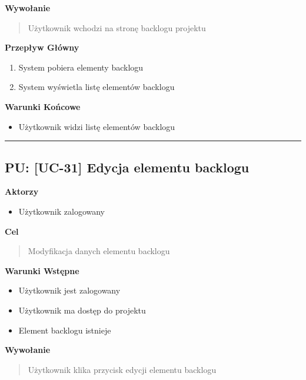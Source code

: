 \vspace{0.2cm}
\noindent\textbf{Wywołanie}
\begin{quote}
    Użytkownik wchodzi na stronę backlogu projektu
\end{quote}

\vspace{0.2cm}
\noindent\textbf{Przepływ Główny}
\begin{enumerate}
    \item System pobiera elementy backlogu
    \item System wyświetla listę elementów backlogu
\end{enumerate}

\vspace{0.2cm}
\noindent\textbf{Warunki Końcowe}
\begin{itemize}
    \item Użytkownik widzi listę elementów backlogu
\end{itemize}


\hrule
\vspace{1cm}

\subsection*{PU: [UC-31] Edycja elementu backlogu}

\noindent\textbf{Aktorzy}
\begin{itemize}
    \item Użytkownik zalogowany
\end{itemize}

\vspace{0.2cm}
\noindent\textbf{Cel}
\begin{quote}
    Modyfikacja danych elementu backlogu
\end{quote}

\vspace{0.2cm}
\noindent\textbf{Warunki Wstępne}
\begin{itemize}
    \item Użytkownik jest zalogowany
    \item Użytkownik ma dostęp do projektu
    \item Element backlogu istnieje
\end{itemize}

\vspace{0.2cm}
\noindent\textbf{Wywołanie}
\begin{quote}
    Użytkownik klika przycisk edycji elementu backlogu
\end{quote}

